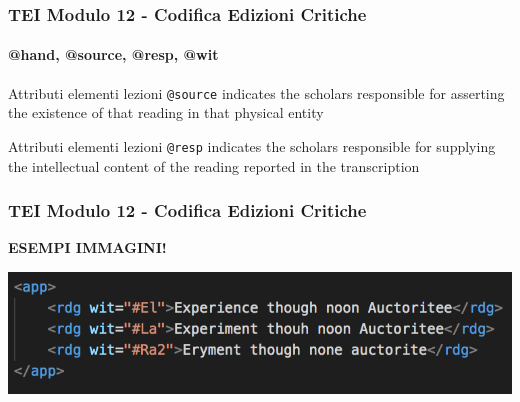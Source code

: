 \begin{frame}
    \frametitle{TEI Modulo 12 - Codifica Edizioni Critiche}
    \framesubtitle{@hand, @source, @resp, @wit}
    \addtocounter{nframe}{1}





    \begin{block}{Attributi elementi lezioni}
        \texttt{@source} indicates the scholars responsible for asserting the existence of that reading in that physical entity
    \end{block}

    \begin{block}{Attributi elementi lezioni}
         \texttt{@resp} indicates the scholars responsible for supplying the intellectual content of the reading reported in the transcription
    \end{block}

\end{frame}

\begin{frame}
    \frametitle{TEI Modulo 12 - Codifica Edizioni Critiche}
    \addtocounter{nframe}{1}
    

    \textbf{ESEMPI IMMAGINI!}
    
    \begin{center}
        \includegraphics[width=.95\textwidth]{imgs/app-rdg.png}
    \end{center}


\end{frame}

